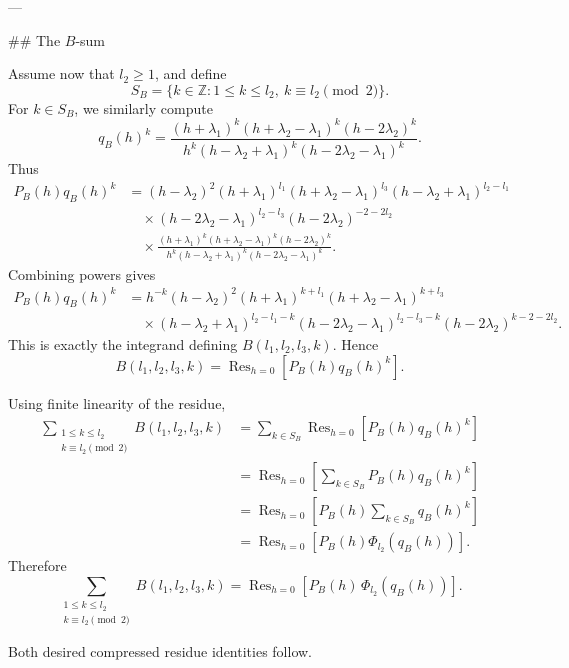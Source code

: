 ---

## The \(B\)-sum

Assume now that \(l_2\ge 1\), and define
\[
S_B=\{k\in\mathbb{Z}:1\le k\le l_2,\ k\equiv l_2\pmod 2\}.
\]
For \(k\in S_B\), we similarly compute
\[
q_B(h)^k
=
\frac{(h+\lambda_1)^k(h+\lambda_2-\lambda_1)^k(h-2\lambda_2)^k}
{h^k(h-\lambda_2+\lambda_1)^k(h-2\lambda_2-\lambda_1)^k}.
\]
Thus
\begin{align*}
P_B(h)q_B(h)^k
&=
(h-\lambda_2)^2
(h+\lambda_1)^{l_1}
(h+\lambda_2-\lambda_1)^{l_3}
(h-\lambda_2+\lambda_1)^{l_2-l_1} \\
&\quad\times
(h-2\lambda_2-\lambda_1)^{l_2-l_3}
(h-2\lambda_2)^{-2-2l_2} \\
&\quad\times
\frac{(h+\lambda_1)^k(h+\lambda_2-\lambda_1)^k(h-2\lambda_2)^k}
{h^k(h-\lambda_2+\lambda_1)^k(h-2\lambda_2-\lambda_1)^k}.
\end{align*}
Combining powers gives
\begin{align*}
P_B(h)q_B(h)^k
&=
h^{-k}(h-\lambda_2)^2
(h+\lambda_1)^{k+l_1}
(h+\lambda_2-\lambda_1)^{k+l_3} \\
&\quad\times
(h-\lambda_2+\lambda_1)^{l_2-l_1-k}
(h-2\lambda_2-\lambda_1)^{l_2-l_3-k}
(h-2\lambda_2)^{k-2-2l_2}.
\end{align*}
This is exactly the integrand defining \(B(l_1,l_2,l_3,k)\). Hence
\[
B(l_1,l_2,l_3,k)
=
\operatorname{Res}_{h=0}\!\left[P_B(h)q_B(h)^k\right].
\]

Using finite linearity of the residue,
\begin{align*}
\sum_{\substack{1\le k\le l_2\\ k\equiv l_2\pmod 2}}
B(l_1,l_2,l_3,k)
&=
\sum_{k\in S_B}
\operatorname{Res}_{h=0}\!\left[P_B(h)q_B(h)^k\right] \\
&=
\operatorname{Res}_{h=0}\!\left[
\sum_{k\in S_B}P_B(h)q_B(h)^k
\right] \\
&=
\operatorname{Res}_{h=0}\!\left[
P_B(h)\sum_{k\in S_B}q_B(h)^k
\right] \\
&=
\operatorname{Res}_{h=0}\!\left[
P_B(h)\Phi_{l_2}(q_B(h))
\right].
\end{align*}
Therefore
\[
\boxed{
\sum_{\substack{1\le k\le l_2\\ k\equiv l_2\pmod2}} B(l_1,l_2,l_3,k)
=
\operatorname{Res}_{h=0}\!\left[P_B(h)\,\Phi_{l_2}(q_B(h))\right].
}
\]

Both desired compressed residue identities follow.